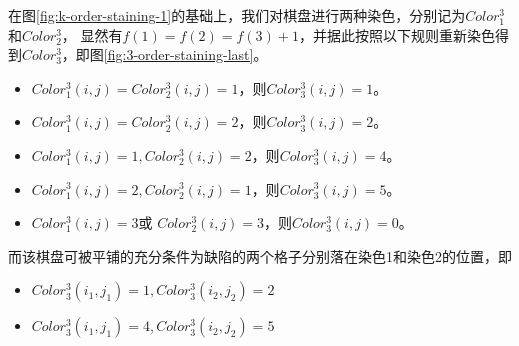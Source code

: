 在图\ref*{fig:k-order-staining-1}的基础上，我们对棋盘进行两种染色，分别记为$Color^3_1$和$Color^3_2$，
显然有$f(1) = f(2) = f(3) + 1$，并据此按照以下规则重新染色得到$Color^3_3$，即图\ref*{fig:3-order-staining-last}。

\begin{itemize}
	\item $Color^3_1(i, j) = Color^3_2(i, j) = 1$，则$Color^3_3(i, j) = 1$。
	\item $Color^3_1(i, j) = Color^3_2(i, j) = 2$，则$Color^3_3(i, j) = 2$。
	\item $Color^3_1(i, j) = 1, Color^3_2(i, j) = 2$，则$Color^3_3(i, j) = 4$。
	\item $Color^3_1(i, j) = 2, Color^3_2(i, j) = 1$，则$Color^3_3(i, j) = 5$。
	\item $Color^3_1(i, j) = 3$或 $Color^3_2(i, j) = 3$，则$Color^3_3(i, j) = 0$。
\end{itemize}

而该棋盘可被平铺的充分条件为缺陷的两个格子分别落在染色1和染色2的位置，即

\begin{itemize}
	\item $Color^3_3(i_1, j_1) = 1, Color^3_3(i_2, j_2) = 2$
	\item $Color^3_3(i_1, j_1) = 4, Color^3_3(i_2, j_2) = 5$
\end{itemize}


